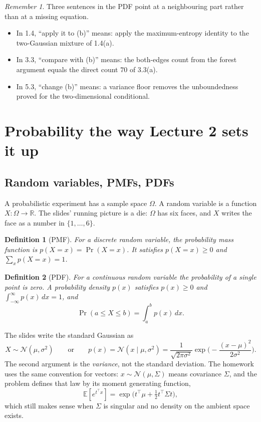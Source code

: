 \documentclass[11pt]{article}
\newtheorem{definition}{Definition}
\theoremstyle{remark}
\newtheorem{remember}{Remember}
\newcommand{\E}{\mathbb{E}}
\newcommand{\R}{\mathbb{R}}
\newcommand{\N}{\mathcal{N}}
\begin{document}
\begin{remember}
Three sentences in the PDF point at a neighbouring part rather than at a missing equation.
\begin{itemize}
\item In 1.4, ``apply it to (b)'' means: apply the maximum-entropy identity to the two-Gaussian mixture of 1.4(a).
\item In 3.3, ``compare with (b)'' means: the both-edges count from the forest argument equals the direct count \(70\) of 3.3(a).
\item In 5.3, ``change (b)'' means: a variance floor removes the unboundedness proved for the two-dimensional conditional.
\end{itemize}
\end{remember}

\section{Probability the way Lecture 2 sets it up}
\label{sec:prob}

\subsection{Random variables, PMFs, PDFs}

A probabilistic experiment has a sample space \(\Omega\). A random variable is a function \(X:\Omega\to\R\). The slides' running picture is a die: \(\Omega\) has six faces, and \(X\) writes the face as a number in \(\{1,\ldots,6\}\).

\begin{definition}[PMF]
For a discrete random variable, the probability mass function is \(p(X=x)=\Pr(X=x)\). It satisfies \(p(X=x)\ge 0\) and \(\sum_x p(X=x)=1\).
\end{definition}

\begin{definition}[PDF]
For a continuous random variable the probability of a single point is zero. A probability density \(p(x)\) satisfies \(p(x)\ge 0\) and \(\int_{-\infty}^{\infty}p(x)\,dx=1\), and
\[
\Pr(a\le X\le b)=\int_a^b p(x)\,dx.
\]
\end{definition}

The slides write the standard Gaussian as
\[
X\sim\N(\mu,\sigma^2)
\qquad\text{or}\qquad
p(x)=\N(x\mid\mu,\sigma^2)
=\frac{1}{\sqrt{2\pi\sigma^2}}\exp\Big(-\frac{(x-\mu)^2}{2\sigma^2}\Big).
\]
The second argument is the \emph{variance}, not the standard deviation. The homework uses the same convention for vectors: \(x\sim\N(\mu,\Sigma)\) means covariance \(\Sigma\), and the problem defines that law by its moment generating function,
\[
\E[e^{t^\top x}]=\exp\big(t^\top\mu+\tfrac12 t^\top\Sigma t\big),
\]
which still makes sense when \(\Sigma\) is singular and no density on the ambient space exists.
\end{document}
